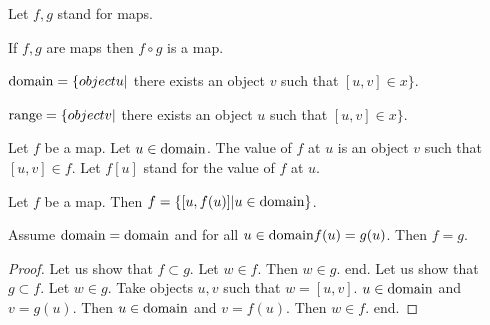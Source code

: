 \documentclass[a4paper,draft]{amsproc}
\begin{document}
\begin{forthel}
Let $f, g$ stand for maps.

\begin{theorem}
If $f, g$ are maps then $f \circ g$ is a map.
\end{theorem}

\begin{definition}
$\domain x = \{object u | $ there exists an object $v$ such that $[u,v] \in x\}$.
\end{definition}

\begin{definition}
$\range x = \{object v | $ there exists an object $u$ such that $[u,v] \in x\}$.
\end{definition}


\begin{signature}
Let $f$ be a map. Let $u \in \domain f$.
The value of $f$ at $u$ is an object $v$ such that $[u,v] \in f$.
Let $f[u]$ stand for the value of $f$ at $u$.
\end{signature}


\begin{theorem}
Let $f$ be a map. Then $f = \{[u,f(u)] | u \in \domain f\}$.
\end{theorem}

\begin{theorem}
Assume $\domain f = \domain g$ and for all $u \in \domain f f(u) = g(u)$. Then $f = g$.
\end{theorem}
\begin{proof}
Let us show that $f \subset g$.
Let $w \in f$. 
Then $w \in g$. end.
Let us show that $g \subset f$.
Let $w \in g$.  
Take objects $u, v$ such that $w=[u,v]$.
$u \in \domain g$ and $v = g(u)$.
Then $u \in \domain f$ and $v = f(u)$.
Then $w \in f$. end.
\end{proof}


\end{forthel}
\end{document}
